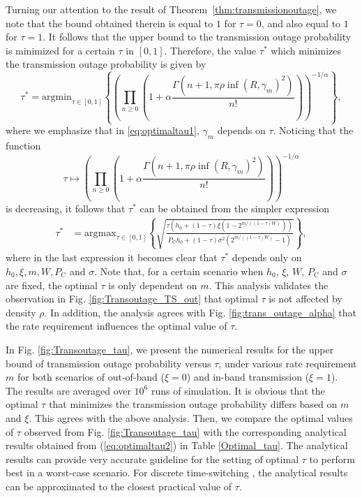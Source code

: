 \documentclass[12pt,draftclsnofoot,onecolumn]{IEEEtran}
\begin{document}
Turning our attention to the result of Theorem~\ref{thm:transmissionoutage}, we note that the bound obtained therein is equal to $1$ for $\tau=0$, and also equal to $1$ for $\tau=1$. It follows that the upper bound to the transmission outage probability is minimized for a certain $\tau$ in $[0,1]$. Therefore, the value $\tau^*$ which minimizes the transmission outage probability is given by
\begin{equation}
\label{eq:optimaltau1}
\tau^*=\mathrm{argmin}_{\tau\in[0,1]}\left\{\left(\prod_{n\ge 0} \left(1+\alpha  \frac{\Gamma(n+1,  \pi\rho\inf(R,\gamma_m)^2)}{n!}\right)\right)^{-1/\alpha}\right\},
\end{equation}
where we emphasize that in \eqref{eq:optimaltau1}, $\gamma_m$ depends on $\tau$. Noticing that the function
\begin{equation*}
\tau\longmapsto\left(\prod_{n\ge 0} \left(1+\alpha  \frac{\Gamma(n+1,  \pi\rho\inf(R,\gamma_m)^2)}{n!}\right)\right)^{-1/\alpha}
\end{equation*}
is decreasing, it follows that $\tau^*$ can be obtained from the simpler expression
\begin{align}
\label{eq:optimaltau2}
\tau^*& = \mathrm{argmax}_{\tau\in[0,1]}\left\{\sqrt{ \frac{\tau\left(h_0+(1-\tau)\xi\left(1-2^{m/((1-\tau)W)}\right)\right)}{P_{\mathrm C}h_0+(1-\tau)\sigma^2\left(2^{m/((1-\tau)W)}-1\right)}}\right\},
\end{align}
where in the last expression it becomes clear that $\tau^*$ depends only on $h_0,\xi,m,W,P_{\mathrm C}$ and $\sigma$. Note that, for a certain scenario when $h_0$, $\xi$, $W$, $P_{\mathrm C}$ and $\sigma$ are fixed, the optimal $\tau$ is only dependent on $m$. This analysis validates the observation in Fig. \ref{fig:Transoutage_TS_out} that optimal $\tau$ is not affected by density $\rho$. In addition, the analysis agrees with Fig. \ref{fig:trans_outage_alpha} that the rate requirement influences the optimal value of $\tau$.  





In Fig. \ref{fig:Transoutage_tau}, we present the numerical results for the upper bound of transmission outage probability versus $\tau$, under various rate requirement $m$ for both scenarios of out-of-band ($\xi=0$) and in-band transmission ($\xi=1$). The results are averaged over $10^6$ runs of simulation. It is obvious that the optimal $\tau$ that minimizes the transmission outage probability differs based on $m$ and $\xi$. This agrees with the above analysis. Then, we compare the optimal values of $\tau$ observed from Fig. \ref{fig:Transoutage_tau} with the corresponding analytical results obtained from (\ref{eq:optimaltau2}) in Table \ref{Optimal_tau}. The analytical results can provide very accurate guideline for the setting of optimal $\tau$ to perform best in a worst-case scenario. For discrete time-switching \cite{SDurrani2013}, the analytical results can be approximated to the closest practical value of $\tau$.    
\end{document}
